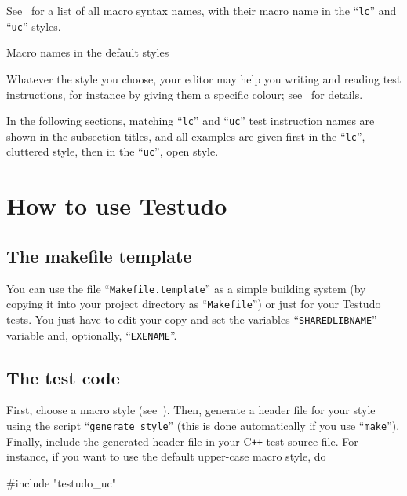 \documentclass[twoside, a4paper, article]{memoir}
\newcommand*\Cpp{C\texttt{++}}
\begin{document}
See~ for a list of all macro syntax names, with their
macro name in the ``\texttt{lc}'' and ``\texttt{uc}'' styles.

\begin{table}
  \centering
  \begin{footnotesize}
    
  \end{footnotesize}
  \caption{Macro names in the default styles}
  \label{tab:style-table}
\end{table}

Whatever the style you choose, your editor may help you writing and reading
test instructions, for instance by giving them a specific colour;
see~ for details.

In the following sections, matching ``\texttt{lc}'' and ``\texttt{uc}'' test
instruction names are shown in the subsection titles, and all examples are
given first in the ``\texttt{lc}'', cluttered style, then in the
``\texttt{uc}'', open style.


\chapter{How to use Testudo}
\label{cha:how-to-use}

\section{The makefile template}
\label{sec:makefile-template}

You can use the file ``\texttt{Makefile.template}'' as a simple building system
(by copying it into your project directory as ``\texttt{Makefile}'') or just
for your Testudo tests.  You just have to edit your copy and set the variables
``\texttt{SHAREDLIBNAME}'' variable and, optionally, ``\texttt{EXENAME}''.

\section{The test code}
\label{sec:test-code}

First, choose a macro style
(see~).  Then, generate a
header file for your style using the script ``\texttt{generate\_style}'' (this
is done automatically if you use ``\texttt{make}'').  Finally, include the
generated header file in your \Cpp{} test source file.  For instance, if you
want to use the default upper-case macro style, do
\begin{cpplisting}
#include "testudo_uc"
\end{cpplisting}
\end{document}
